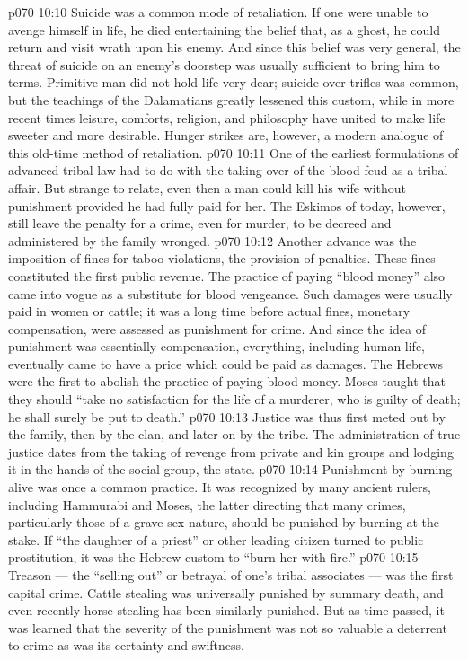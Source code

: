 \vs p070 10:10 Suicide was a common mode of retaliation. If one were unable to avenge himself in life, he died entertaining the belief that, as a ghost, he could return and visit wrath upon his enemy. And since this belief was very general, the threat of suicide on an enemy’s doorstep was usually sufficient to bring him to terms. Primitive man did not hold life very dear; suicide over trifles was common, but the teachings of the Dalamatians greatly lessened this custom, while in more recent times leisure, comforts, religion, and philosophy have united to make life sweeter and more desirable. Hunger strikes are, however, a modern analogue of this old\hyp{}time method of retaliation.
\vs p070 10:11 One of the earliest formulations of advanced tribal law had to do with the taking over of the blood feud as a tribal affair. But strange to relate, even then a man could kill his wife without punishment provided he had fully paid for her. The Eskimos of today, however, still leave the penalty for a crime, even for murder, to be decreed and administered by the family wronged.
\vs p070 10:12 Another advance was the imposition of fines for taboo violations, the provision of penalties. These fines constituted the first public revenue. The practice of paying “blood money” also came into vogue as a substitute for blood vengeance. Such damages were usually paid in women or cattle; it was a long time before actual fines, monetary compensation, were assessed as punishment for crime. And since the idea of punishment was essentially compensation, everything, including human life, eventually came to have a price which could be paid as damages. The Hebrews were the first to abolish the practice of paying blood money. Moses taught that they should “take no satisfaction for the life of a murderer, who is guilty of death; he shall surely be put to death.”
\vs p070 10:13 \pc Justice was thus first meted out by the family, then by the clan, and later on by the tribe. The administration of true justice dates from the taking of revenge from private and kin groups and lodging it in the hands of the social group, the state.
\vs p070 10:14 \pc Punishment by burning alive was once a common practice. It was recognized by many ancient rulers, including Hammurabi and Moses, the latter directing that many crimes, particularly those of a grave sex nature, should be punished by burning at the stake. If “the daughter of a priest” or other leading citizen turned to public prostitution, it was the Hebrew custom to “burn her with fire.”
\vs p070 10:15 Treason --- the “selling out” or betrayal of one’s tribal associates --- was the first capital crime. Cattle stealing was universally punished by summary death, and even recently horse stealing has been similarly punished. But as time passed, it was learned that the severity of the punishment was not so valuable a deterrent to crime as was its certainty and swiftness.
